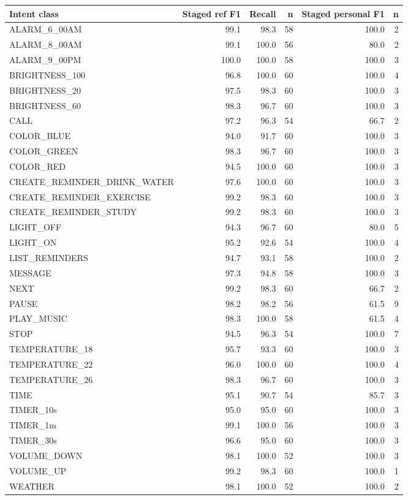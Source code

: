 \documentclass[11pt,a4paper]{article}
\begin{document}
\footnotesize
\begin{longtable}{p{}rrrrr}
\toprule Intent class & Staged ref F1 & Recall & n & Staged personal F1 & n \\
\midrule\endhead
ALARM\_6\_00AM & 99.1 & 98.3 & 58 & 100.0 & 2 \\
ALARM\_8\_00AM & 99.1 & 100.0 & 56 & 80.0 & 2 \\
ALARM\_9\_00PM & 100.0 & 100.0 & 58 & 100.0 & 3 \\
BRIGHTNESS\_100 & 96.8 & 100.0 & 60 & 100.0 & 4 \\
BRIGHTNESS\_20 & 97.5 & 98.3 & 60 & 100.0 & 3 \\
BRIGHTNESS\_60 & 98.3 & 96.7 & 60 & 100.0 & 3 \\
CALL & 97.2 & 96.3 & 54 & 66.7 & 2 \\
COLOR\_BLUE & 94.0 & 91.7 & 60 & 100.0 & 3 \\
COLOR\_GREEN & 98.3 & 96.7 & 60 & 100.0 & 3 \\
COLOR\_RED & 94.5 & 100.0 & 60 & 100.0 & 3 \\
CREATE\_\allowbreak REMINDER\_\allowbreak DRINK\_\allowbreak WATER & 97.6 & 100.0 & 60 & 100.0 & 3 \\
CREATE\_\allowbreak REMINDER\_\allowbreak EXERCISE & 99.2 & 98.3 & 60 & 100.0 & 3 \\
CREATE\_\allowbreak REMINDER\_\allowbreak STUDY & 99.2 & 98.3 & 60 & 100.0 & 3 \\
LIGHT\_OFF & 94.3 & 96.7 & 60 & 80.0 & 5 \\
LIGHT\_ON & 95.2 & 92.6 & 54 & 100.0 & 4 \\
LIST\_REMINDERS & 94.7 & 93.1 & 58 & 100.0 & 2 \\
MESSAGE & 97.3 & 94.8 & 58 & 100.0 & 3 \\
NEXT & 99.2 & 98.3 & 60 & 66.7 & 2 \\
PAUSE & 98.2 & 98.2 & 56 & 61.5 & 9 \\
PLAY\_MUSIC & 98.3 & 100.0 & 58 & 61.5 & 4 \\
STOP & 94.5 & 96.3 & 54 & 100.0 & 7 \\
TEMPERATURE\_18 & 95.7 & 93.3 & 60 & 100.0 & 3 \\
TEMPERATURE\_22 & 96.0 & 100.0 & 60 & 100.0 & 4 \\
TEMPERATURE\_26 & 98.3 & 96.7 & 60 & 100.0 & 3 \\
TIME & 95.1 & 90.7 & 54 & 85.7 & 3 \\
TIMER\_10s & 95.0 & 95.0 & 60 & 100.0 & 3 \\
TIMER\_1m & 99.1 & 100.0 & 56 & 100.0 & 3 \\
TIMER\_30s & 96.6 & 95.0 & 60 & 100.0 & 3 \\
VOLUME\_DOWN & 98.1 & 100.0 & 52 & 100.0 & 3 \\
VOLUME\_UP & 99.2 & 98.3 & 60 & 100.0 & 1 \\
WEATHER & 98.1 & 100.0 & 52 & 100.0 & 2 \\
\bottomrule\end{longtable}
\normalsize
\normalsize
\end{document}
